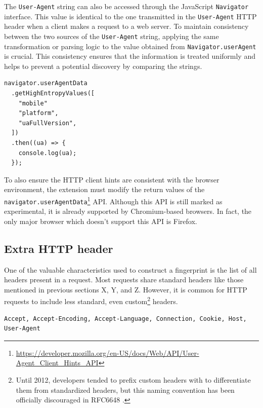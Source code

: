 The \texttt{User-Agent} string can also be accessed through the JavaScript \texttt{Navigator} interface. This value is identical to the one transmitted in the \texttt{User-Agent} HTTP header when a client makes a request to a web server. To maintain consistency between the two sources of the \texttt{User-Agent} string, applying the same transformation or parsing logic to the value obtained from \texttt{Navigator.userAgent} is crucial. This consistency ensures that the information is treated uniformly and helps to prevent a potential discovery by comparing the strings.

\bigbreak

\begin{lstlisting}[caption={An example the User-Agent Client Hints API usage \cite{MDN}. This API call returns the same values as the HTTP client hints in example \ref{Listing:HTTPClientHintsExample}.}]
navigator.userAgentData
  .getHighEntropyValues([
  	"mobile"
    "platform",
    "uaFullVersion",
  ])
  .then((ua) => {
    console.log(ua);
  });	
\end{lstlisting}

\medbreak

To also ensure the HTTP client hints are consistent with the browser environment, the extension must modify the return values of the \texttt{navigator.userAgentData}\footnote{\url{https://developer.mozilla.org/en-US/docs/Web/API/User-Agent_Client_Hints_API}} API. Although this API is still marked as experimental, it is already supported by Chromium-based browsers. In fact, the only major browser which doesn't support this API is Firefox.

\subsection{Extra HTTP header}
\label{SubSection:ExtraHTTPHeader}

One of the valuable characteristics used to construct a fingerprint is the list of all headers present in a request. Most requests share standard headers like those mentioned in previous sections X, Y, and Z. However, it is common for HTTP requests to include less standard, even custom\footnote{Until 2012, developers tended to prefix custom headers with  to differentiate them from standardized headers, but this naming convention has been officially discouraged in RFC6648 \cite{RFC6648}.} headers.

\bigbreak

\begin{lstlisting}[caption={An example of a list of headers present in an HTTP request.}]
Accept, Accept-Encoding, Accept-Language, Connection, Cookie, Host, User-Agent
\end{lstlisting}


